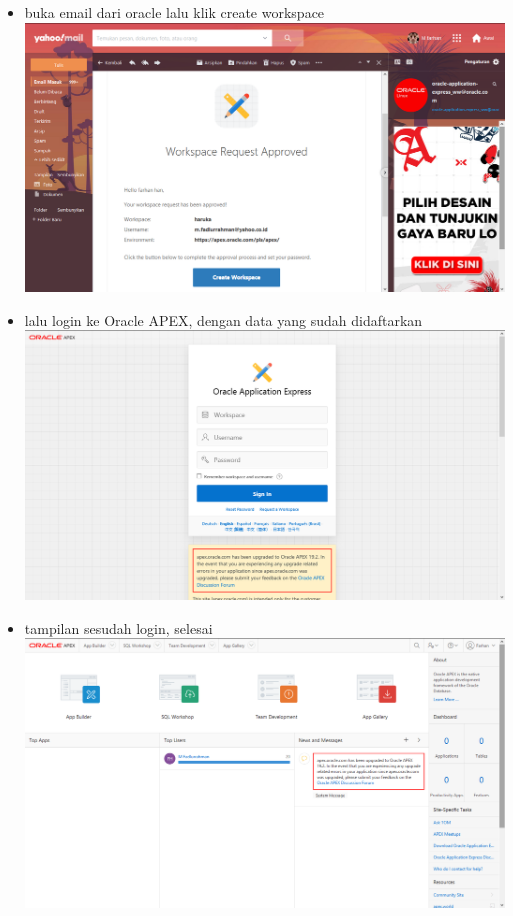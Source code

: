 \documentclass[12pt]{article}
\begin{document}
\begin{itemize}
	\item buka email dari oracle lalu klik create workspace\\
\includegraphics[scale=0.3]{pic/4}	
	
	\item lalu login ke Oracle APEX, dengan data yang sudah didaftarkan\\
\includegraphics[scale=0.3]{pic/5}	
	
	\item tampilan sesudah login, selesai\\	\includegraphics[scale=0.3]{pic/6}
	
\end{itemize}
\end{document}
